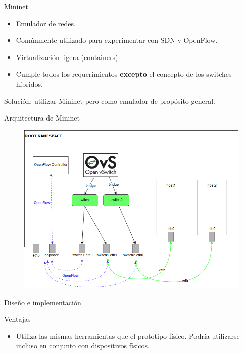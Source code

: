 \documentclass[xcolor=svgnames]{beamer}
\begin{document}
\begin{frame}{Mininet}
	\begin{itemize}
		\item Emulador de redes.
		\item Comúnmente utilizado para experimentar con SDN y OpenFlow.
		\item Virtualización ligera (containers).
		\item Cumple todos los requerimientos \textbf{excepto} el concepto de los switches híbridos.
	\end{itemize}
	\pause
	{\color{green}Solución: utilizar Mininet pero como emulador de propósito general.}
\end{frame}

\begin{frame}{Arquitectura de Mininet}
	\begin{figure}[t]
		\centering
		\includegraphics[scale=0.5]{mininet_architecture}
	\end{figure}
\end{frame}

\begin{frame}{Diseño e implementación}
	
\end{frame}

\begin{frame}{Ventajas}
	\begin{itemize}
		\item Utiliza las mismas herramientas que el prototipo físico. Podría utilizarse incluso en conjunto con dispositivos físicos.
	\end{itemize}
\end{frame}
\end{document}
